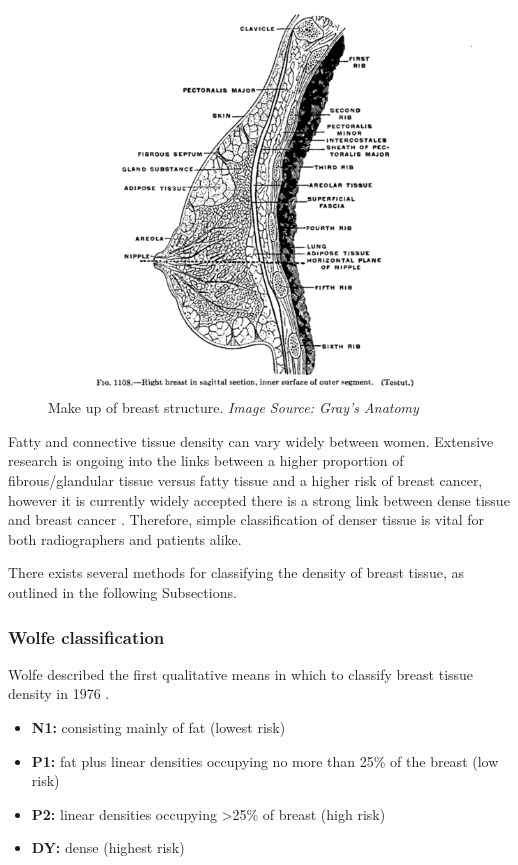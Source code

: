 \begin{figure}[!h]
  \center
  \includegraphics[scale=0.4]{Chapter1/background-img/breast_anatomy.png}
  \caption{Make up of breast structure. \textit{Image Source: Gray's Anatomy \cite{Gray_1907}}}
  \label{fig:breast-anatomy}
\end{figure}

Fatty and connective tissue density can vary widely between women. Extensive research is ongoing into the links between a higher proportion of fibrous/glandular tissue versus fatty tissue and a higher risk of breast cancer, however it is currently widely accepted there is a strong link between dense tissue and breast cancer \cite{Boyd_Byng_Jong_Fishell_Little_Miller_Lockwood_Tritchler_Yaffe_1995}. Therefore, simple classification of denser tissue is vital for both radiographers and patients alike.

There exists several methods for classifying the density of breast tissue, as outlined in the following Subsections.

\subsubsection{Wolfe classification}

Wolfe described the first qualitative means in which to classify breast tissue density in 1976 \cite{Wolfe_1976}.

\begin{itemize}
    \item \textbf{N1:} consisting mainly of fat (lowest risk)
    \item \textbf{P1:} fat plus linear densities occupying no more than 25\% of the breast (low risk)
    \item \textbf{P2:} linear densities occupying \textgreater 25\% of breast (high risk)
    \item \textbf{DY:} dense (highest risk)
\end{itemize}


